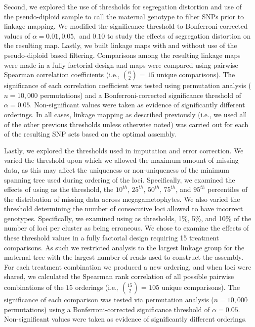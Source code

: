 \documentclass[11pt]{article}
\begin{document}
Second, we explored the use of thresholds for segregation distortion and 
use of the pseudo-diploid sample to call the maternal genotype to filter SNPs prior to linkage mapping. 
We modified the significance threshold to Bonferroni-corrected values of $\alpha = 0.01, 0.05,$ 
and $0.10$ to study the effects of segregation distortion on the resulting map. 
Lastly, we built linkage maps with and without use of the pseudo-diploid based filtering. Comparisons among the resulting linkage 
maps were made in a fully factorial design and maps were compared using pairwise Spearman correlation coefficients 
(i.e., {$6 \choose 2$} = $15$ unique comparisons). The significance of each correlation coefficient 
was tested using permutation analysis ($n = 10,000$ permutations) and a Bonferroni-corrected significance threshold of $\alpha = 0.05$. 
Non-significant values were taken as evidence of significantly different orderings. In all cases, linkage mapping as described previously 
(i.e., we used all of the other previous thresholds unless otherwise noted) was carried out for each of the resulting SNP sets based on 
the optimal assembly.

Lastly, we explored the thresholds used in imputation and error correction. We varied the threshold upon which 
we allowed the maximum amount of missing data, as this may affect the uniqueness 
or non-uniqueness of the minimum spanning tree used during ordering of the loci. Specifically, 
we examined the effects of using as the threshold, the $10^{th}$, $25^{th}$, $50^{th}$, $75^{th}$, and $95^{th}$ percentiles of 
the distribution of missing data across megagametophytes. We also varied the threshold determining 
the number of consecutive loci allowed to have incorrect genotypes. Specifically, we 
examined using as thresholds, 1\%, 5\%, and 10\% of the number of loci per cluster as being erroneous. We chose to 
examine the effects of these threshold values in a fully factorial design requiring 15 treatment comparisons. As such we restricted 
analysis to the largest linkage group for the maternal tree with the largest number of reads used to construct 
the assembly. For each treatment combination we produced a new ordering, and when loci were shared, we calculated 
the Spearman rank correlation of all possible pairwise combinations of the $15$ orderings (i.e., {$15 \choose 2$} = $105$ unique 
comparisons). The significance of each comparison was tested via permutation analysis ($n = 10,000$ permutations) 
using a Bonferroni-corrected significance threshold of $\alpha = 0.05$. Non-significant values were taken as evidence of significantly 
different orderings.
\end{document}

